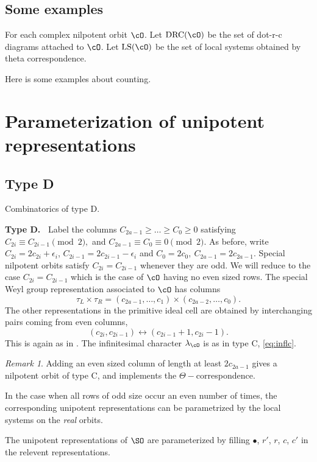 \documentclass[12pt,a4paper]{amsart}
\numberwithin{equation}{section}
\theoremstyle{remark}
\newtheorem*{remark}{Remark}
\def\drc{\mathrm{DRC}}
\def\LS{\mathrm{LS}}
\begin{document}
\subsection{Some examples}
For each complex nilpotent orbit $\cO$.
Let $\drc(\cO)$ be the set of dot-r-c diagrams attached to $\cO$.
Let $\LS(\cO)$ be the set of local systems obtained by theta correspondence. 

Here is some examples about counting.


\section{Parameterization of unipotent representations}

\subsection{Type D}
Combinatorics of type D. 

\noindent\textbf{Type D.\ } Label the columns $C_{2a-1}\ge\dots \ge
C_0\ge 0$ satisfying $C_{2i}\equiv C_{2i-1} \pmod{2},$ and
$C_{2a-1}\equiv C_0\equiv 0 \pmod{2}.$ As before, write $C_{2i}=2c_{2i}+\epsilon_i$,
$C_{2i-1}=2c_{2i-1}-\epsilon_i$ and $C_0=2c_0,\ C_{2a-1}=2c_{2a-1}.$ Special
nilpotent orbits satisfy $C_{2i}=C_{2i-1}$ whenever they are odd. We will reduce
to the case $C_{2i}=C_{2i-1}$ which is the case of $\cO$ having no even sized
rows.  The special Weyl group representation associated to $\cO$ has columns
\begin{equation}
  \label{eq:drep}
\tau_L\times\tau_R=(c_{2a-1},\dots ,c_1)\times (c_{2a-2},\dots
,c_0).  
\end{equation}
The other representations in the primitive ideal cell are obtained by
interchanging pairs coming from even columns, 
$$
(c_{2i},c_{2i-1})\longleftrightarrow (c_{2i-1}+1,c_{2i}-1).
$$
This is again as in  \cite{Mc}.  
The infinitesimal character $\lambda_{\cO}$ is as in type C, \eqref{eq:inflc}.
\begin{remark}
Adding an even sized column of length at least $2c_{2a-1}$ gives a
nilpotent orbit of type C, and implements the $\Theta-$correspondence. 

In the case when all rows of odd size occur an even number of times,
the corresponding unipotent representations can be parametrized by the
local systems on the \textit{real} orbits.
\end{remark}


The unipotent representations of $\SO$ are parameterized by 
filling $\bullet$, $r'$, $r$, $c$, $c'$ in the relevent representations.
\end{document}
